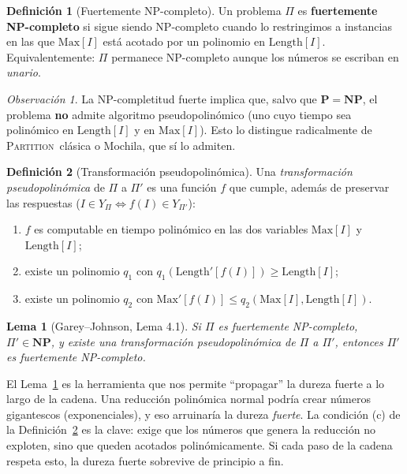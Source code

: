 \documentclass[12pt,a4paper]{article}
\newtheorem{lemma}[theorem]{Lema}
\theoremstyle{definition}
\newtheorem{definition}{Definición}
\theoremstyle{remark}
\newtheorem{remark}{Observación}
\newcommand{\PART}{\textsc{Partition}}
\begin{document}
\begin{definition}[Fuertemente NP-completo]
Un problema $\Pi$ es \textbf{fuertemente NP-completo} si sigue siendo NP-completo
cuando lo restringimos a instancias en las que $\mathrm{Max}[I]$ está acotado por
un polinomio en $\mathrm{Length}[I]$. Equivalentemente: $\Pi$ permanece NP-completo
aunque los números se escriban en \emph{unario}.
\end{definition}

\begin{remark}
La NP-completitud fuerte implica que, salvo que $\mathbf{P}=\mathbf{NP}$,
el problema \textbf{no} admite algoritmo pseudopolinómico (uno cuyo tiempo sea
polinómico en $\mathrm{Length}[I]$ y en $\mathrm{Max}[I]$). Esto lo distingue
radicalmente de \PART\ clásica o Mochila, que sí lo admiten.
\end{remark}

\begin{definition}[Transformación pseudopolinómica]
\label{def:pseudopoli}
Una \emph{transformación pseudopolinómica} de $\Pi$ a $\Pi'$ es una función
$f$ que cumple, además de preservar las respuestas
($I \in Y_\Pi \iff f(I) \in Y_{\Pi'}$):
\begin{enumerate}[label=(\alph*)]
  \item $f$ es computable en tiempo polinómico en las dos variables
        $\mathrm{Max}[I]$ y $\mathrm{Length}[I]$;
  \item existe un polinomio $q_1$ con $q_1(\mathrm{Length}'[f(I)]) \geq \mathrm{Length}[I]$;
  \item existe un polinomio $q_2$ con
        $\mathrm{Max}'[f(I)] \leq q_2(\mathrm{Max}[I], \mathrm{Length}[I])$.
\end{enumerate}
\end{definition}

\begin{lemma}[Garey--Johnson, Lema 4.1]
\label{lem:pseudo}
Si $\Pi$ es fuertemente NP-completo, $\Pi' \in \mathbf{NP}$, y existe una
transformación pseudopolinómica de $\Pi$ a $\Pi'$, entonces $\Pi'$ es
fuertemente NP-completo.
\end{lemma}

\begin{intuicion}
El Lema~\ref{lem:pseudo} es la herramienta que nos permite ``propagar'' la
dureza fuerte a lo largo de la cadena. Una reducción polinómica normal podría
crear números gigantescos (exponenciales), y eso arruinaría la dureza
\emph{fuerte}. La condición (c) de la Definición~\ref{def:pseudopoli} es la clave:
exige que los números que genera la reducción no exploten, sino que queden
acotados polinómicamente. Si cada paso de la cadena respeta esto, la dureza
fuerte sobrevive de principio a fin.
\end{intuicion}
\end{document}
